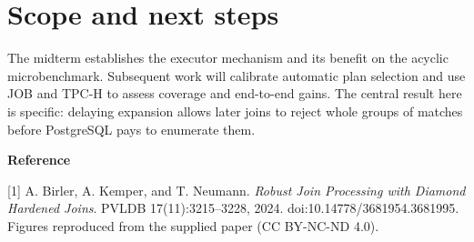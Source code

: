 \documentclass[10pt,twocolumn]{article}
\begin{document}
\section{Scope and next steps}
The midterm establishes the executor mechanism and its benefit on the
acyclic microbenchmark. Subsequent work will calibrate automatic plan selection
and use JOB and TPC-H to assess coverage and end-to-end gains. The central
result here is specific: delaying expansion allows later joins to reject whole
groups of matches before PostgreSQL pays to enumerate them.

\vspace{4pt}
\noindent\small\textbf{Reference}\par
\noindent\small [1] A. Birler, A. Kemper, and T. Neumann.
\emph{Robust Join Processing with Diamond Hardened Joins}.
PVLDB 17(11):3215--3228, 2024. doi:10.14778/3681954.3681995.
Figures reproduced from the supplied paper (CC BY-NC-ND 4.0).
\end{document}
